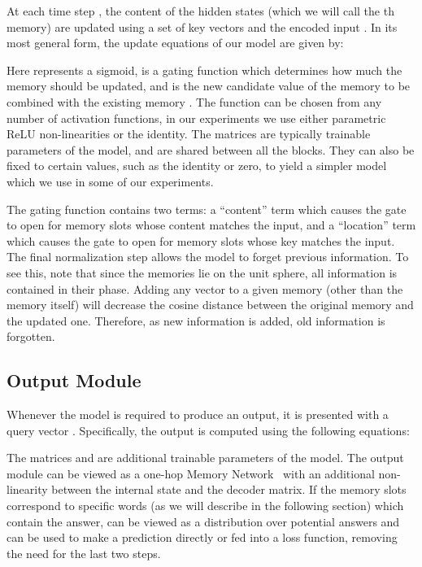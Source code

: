 \documentclass{article} \usepackage{iclr2016_conference,times}
\begin{document}
At each time step , the content of the hidden states  (which we will call the th memory) are updated using a set of key vectors  and the encoded input .
In its most general form, the update equations of our model are given by:






Here  represents a sigmoid,  is a gating function which determines how much the  memory should be updated,
and  is the new candidate value of the memory to be combined with the existing memory .
The function  can be chosen from any number of activation functions, in our experiments we use either parametric ReLU non-linearities \citep{PReLU} or the identity.
The matrices  are typically trainable parameters of the model, and are shared between all the blocks.
They can also be fixed to certain values, such as the identity or zero, to yield a simpler model which we use in some of our experiments.

The gating function  contains two terms: a ``content'' term  which causes the gate to open for memory slots whose content matches the input, and a ``location'' term  which causes the gate to open for memory slots whose key matches the input.
The final normalization step allows the model to forget previous information. 
To see this, note that since the memories lie on the unit sphere, all information is contained in their phase. 
Adding any vector to a given memory (other than the memory itself) will decrease the cosine distance between the original memory and the updated one. 
Therefore, as new information is added, old information is forgotten.

\subsection{Output Module} 

\begin{comment}
One simple case is when we just want to output the identity of one of the blocks, in which case we can use 

If we have a different output space, we can use attention over the hiddens to construct a vectro to be decoded:
\end{comment}

Whenever the model is required to produce an output, it is presented with a query vector . Specifically, the output is computed using the following equations:


The matrices  and  are additional trainable parameters of the model. The output module can be viewed as a one-hop Memory Network~\citep{MemN2N} with an additional non-linearity  between the internal state and the decoder matrix.
If the memory slots correspond to specific words (as we will describe in the following section) which contain the answer,  can be viewed as a distribution over potential answers and can be used to make a prediction directly or fed into a loss function, removing the need for the last two steps.
\end{document}
